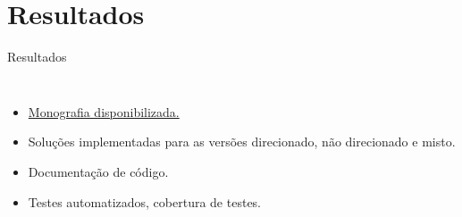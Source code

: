 \documentclass{beamer}
\begin{document}
\section{Resultados}

\begin{frame}{Resultados}
    \begin{columns}
        \begin{itemize}
            \item \href{https://www.linux.ime.usp.br/~gafeol/mac0499/chinese-postman/tex/main.pdf}{Monografia disponibilizada.}
            \item Soluções implementadas para as versões direcionado, não direcionado e misto.
            \item Documentação de código.
            \item Testes automatizados, cobertura de testes.
        \end{itemize} 



\end{columns}
\end{frame}
\end{document}
